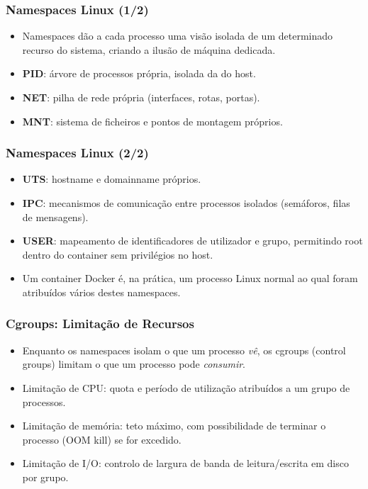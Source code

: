 \documentclass[aspectratio=169]{beamer}
\begin{document}
\begin{frame}
\frametitle{Namespaces Linux \textcolor{NudeTaupe}{\small(1/2)}}
\begin{itemize}
    \setlength\itemsep{0.4cm}
    \item Namespaces dão a cada processo uma visão isolada de um determinado recurso do sistema, criando a ilusão de máquina dedicada.
    \item \textbf{PID}: árvore de processos própria, isolada da do host.
    \item \textbf{NET}: pilha de rede própria (interfaces, rotas, portas).
    \item \textbf{MNT}: sistema de ficheiros e pontos de montagem próprios.
\end{itemize}
\end{frame}

\begin{frame}
\frametitle{Namespaces Linux \textcolor{NudeTaupe}{\small(2/2)}}
\begin{itemize}
    \setlength\itemsep{0.4cm}
    \item \textbf{UTS}: hostname e domainname próprios.
    \item \textbf{IPC}: mecanismos de comunicação entre processos isolados (semáforos, filas de mensagens).
    \item \textbf{USER}: mapeamento de identificadores de utilizador e grupo, permitindo root dentro do container sem privilégios no host.
    \item Um container Docker é, na prática, um processo Linux normal ao qual foram atribuídos vários destes namespaces.
\end{itemize}
\end{frame}

\begin{frame}
\frametitle{Cgroups: Limitação de Recursos}
\begin{itemize}
    \setlength\itemsep{0.4cm}
    \item Enquanto os namespaces isolam o que um processo \emph{vê}, os cgroups (control groups) limitam o que um processo pode \emph{consumir}.
    \item Limitação de CPU: quota e período de utilização atribuídos a um grupo de processos.
    \item Limitação de memória: teto máximo, com possibilidade de terminar o processo (OOM kill) se for excedido.
    \item Limitação de I/O: controlo de largura de banda de leitura/escrita em disco por grupo.
\end{itemize}
\end{frame}
\end{document}
